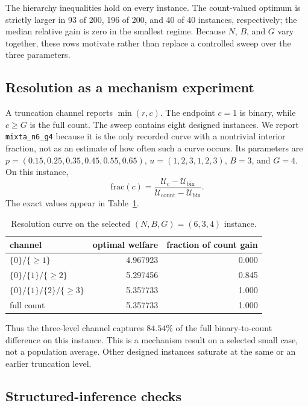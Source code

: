 \documentclass[11pt]{article}
\begin{document}
The hierarchy inequalities hold on every instance. The count-valued optimum is
strictly larger in 93 of 200, 196 of 200, and 40 of 40 instances, respectively;
the median relative gain is zero in the smallest regime. Because $N$, $B$, and
$G$ vary together, these rows motivate rather than replace a controlled sweep
over the three parameters.

\subsection{Resolution as a mechanism experiment}

A truncation channel reports $\min(r,c)$. The endpoint $c=1$ is binary, while
$c\geq G$ is the full count. The sweep contains eight designed instances. We
report \texttt{mixta\_n6\_g4} because it is the only recorded curve with a
nontrivial interior fraction, not as an estimate of how often such a curve
occurs. Its parameters are
$p=(0.15,0.25,0.35,0.45,0.55,0.65)$,
$u=(1,2,3,1,2,3)$, $B=3$, and $G=4$. On this instance,
\[
  \mathrm{frac}(c)=
  \frac{\mathcal U_c-\mathcal U_{\mathrm{bin}}}
       {\mathcal U_{\mathrm{count}}-\mathcal U_{\mathrm{bin}}}.
\]
The exact values appear in Table~\ref{tab:resolution}.

\begin{table}[t]
\centering
\caption{Resolution curve on the selected $(N,B,G)=(6,3,4)$ instance.}
\label{tab:resolution}
\small
\begin{tabular}{lrr}
\toprule
channel & optimal welfare & fraction of count gain \\
\midrule
$\{0\}/\{\geq1\}$ & 4.967923 & 0.000 \\
$\{0\}/\{1\}/\{\geq2\}$ & 5.297456 & 0.845 \\
$\{0\}/\{1\}/\{2\}/\{\geq3\}$ & 5.357733 & 1.000 \\
full count & 5.357733 & 1.000 \\
\bottomrule
\end{tabular}
\end{table}

Thus the three-level channel captures $84.54\%$ of the full binary-to-count
difference on this instance. This is a mechanism result on a selected small
case, not a population average. Other designed instances saturate at the same or
an earlier truncation level.

\subsection{Structured-inference checks}
\end{document}
